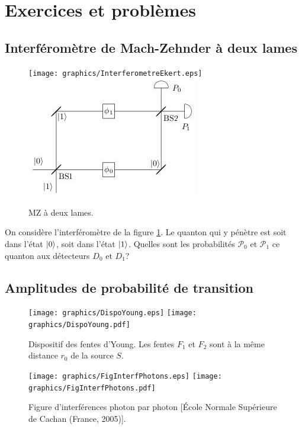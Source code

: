 \newpage

\section{Exercices et problèmes}

\subsection{Interféromètre de Mach-Zehnder à deux lames}
\begin{figure}[ptbh]
\centering
	\ifcase\msipdfoutput
		\texttt{[image: graphics/InterferometreEkert.eps]}%
	\else
		\includegraphics[scale=.8]{graphics/InterferometreEkert.jpg}%
	\fi
\caption{MZ à deux lames.}
\label{fig:MZ2Lames}
\end{figure}

On considère l'interféromètre de la figure \ref{fig:MZ2Lames}. Le quanton qui y
pénètre est soit dans l'état $ \vert0\rangle$, soit dans l'état $\vert1\rangle$. Quelles
sont les probabilités $\mathcal{P}_{0}$ et $\mathcal{P}_1$ ce quanton aux
détecteurs $D_{0}$ et $D_1$?

\subsection{Amplitudes de probabilité de transition}

\begin{figure}[ptbh]
\centering
\begin{minipage}[c]{.6\linewidth}
	\ifcase\msipdfoutput
		\texttt{[image: graphics/DispoYoung.eps]}%
	\else
		\texttt{[image: graphics/DispoYoung.pdf]}%
	\fi
\caption{Dispositif des fentes d'Young. Les fentes $F_1$ et $F_2$ sont à
la même distance $r_{0}$ de la source $S$.}%
\label{fig:DispoYoung}%
	\end{minipage} \hfill\begin{minipage}[c]{.38\linewidth}
	\ifcase\msipdfoutput
		\texttt{[image: graphics/FigInterfPhotons.eps]}%
	\else
		\texttt{[image: graphics/FigInterfPhotons.pdf]}%
	\fi
\caption{Figure d'interférences photon par photon [École Normale Supérieure de
Cachan (France, 2005)].}%
\label{fig:FigInterfPhotons}%
\end{minipage}
\end{figure}


